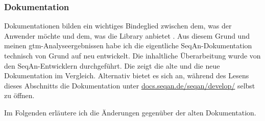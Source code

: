 \subsubsection{Dokumentation}

Dokumentationen bilden ein wichtiges Bindeglied zwischen dem, was der Anwender möchte und dem, was die Library anbietet \citep{Robillard:2009cs,Kintsch:1988bz,Pennington:1987dc}. Aus diesem Grund und meinen \gls{gtm}-Analyseergebnissen habe ich die eigentliche SeqAn-Dokumentation technisch von Grund auf neu entwickelt. Die inhaltliche Überarbeitung wurde von den SeqAn-Entwicklern durchgeführt. Die  zeigt die alte und die neue Dokumentation im Vergleich. Alternativ bietet es sich an, während des Lesens dieses Abschnitts die Dokumentation unter \href{http://docs.seqan.de/seqan/develop/}{docs.seqan.de/seqan/develop/} selbst zu öffnen.

Im Folgenden erläutere ich die Änderungen gegenüber der alten Dokumentation.

